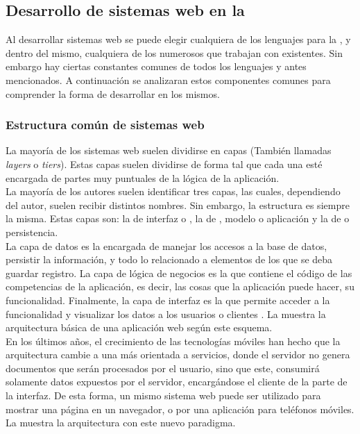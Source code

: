 \subsection{Desarrollo de sistemas web en la \jvm}
\label{subsec:intro:jvm_dev}

Al desarrollar sistemas web se puede elegir cualquiera de los lenguajes para
la \jvm, y dentro del mismo, cualquiera de los numerosos \frameworks que trabajan
con \htmlv existentes. Sin embargo hay ciertas constantes comunes de todos los
lenguajes y \frameworks antes mencionados. A continuación se analizaran estos
componentes comunes para comprender la forma de desarrollar en los mismos.

\subsubsection{Estructura común de sistemas web}
\label{susubbsec:intro:jvm_dev:structure}

La mayoría de los sistemas web suelen dividirse en capas (También llamadas
\emph{layers} o \emph{tiers}). Estas capas suelen dividirse de forma tal que
cada una esté encargada de partes muy puntuales de la lógica de la aplicación.\\
La mayoría de los autores  suelen identificar tres capas, las cuales, dependiendo
del autor, suelen recibir distintos nombres. Sin embargo, la estructura es siempre
la misma. Estas capas son: la de interfaz o \view, la de \logic,
modelo o aplicación y la de \data o persistencia.\\
La capa de datos es la encargada de manejar los accesos a la base de datos, persistir
la información, y todo lo relacionado a elementos de los que se deba guardar registro.
La capa de lógica de negocios es la que contiene el código de las competencias de la
aplicación, es decir, las cosas que la aplicación puede hacer, su funcionalidad.
Finalmente, la capa de interfaz es la que permite acceder a la funcionalidad y visualizar
los datos a los usuarios o clientes .
La  muestra la arquitectura básica de una aplicación
web según este esquema.\\
En los últimos años, el crecimiento de las tecnologías móviles han hecho que la
arquitectura cambie a una más orientada a servicios, donde el servidor no genera
documentos que serán procesados por el usuario, sino que este, consumirá solamente
datos expuestos por el servidor, encargándose el cliente de la parte de la interfaz.
De esta forma, un mismo sistema web puede ser utilizado para mostrar una página en un
navegador, o por una aplicación para teléfonos móviles.
La  muestra la arquitectura con este nuevo
paradigma.

